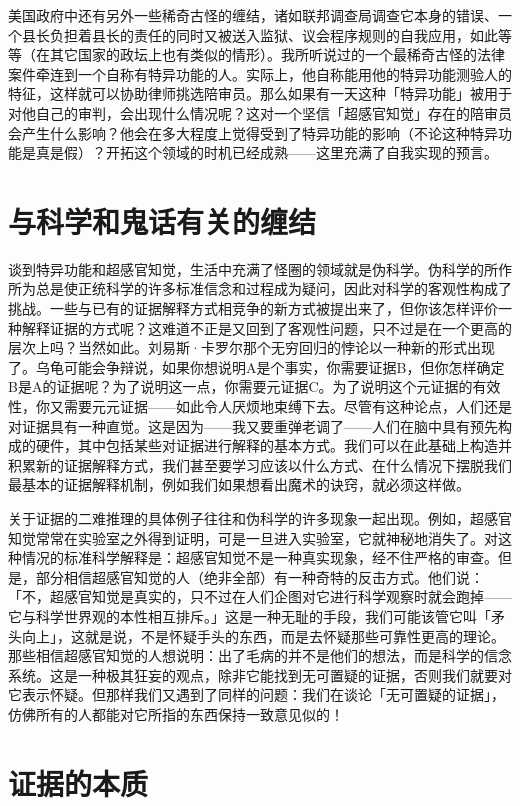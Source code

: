\documentclass[
  12pt,
  twoside,
  openright,
  oldfontcommands,
]{memoir}
\begin{document}
美国政府中还有另外一些稀奇古怪的缠结，诸如联邦调查局调查它本身的错误、一个县长负担着县长的责任的同时又被送入监狱、议会程序规则的自我应用，如此等等（在其它国家的政坛上也有类似的情形）。我所听说过的一个最稀奇古怪的法律案件牵连到一个自称有特异功能的人。实际上，他自称能用他的特异功能测验人的特征，这样就可以协助律师挑选陪审员。那么如果有一天这种「特异功能」被用于对他自己的审判，会出现什么情况呢？这对一个坚信「超感官知觉」存在的陪审员会产生什么影响？他会在多大程度上觉得受到了特异功能的影响（不论这种特异功能是真是假）？开拓这个领域的时机已经成熟------这里充满了自我实现的预言。

\section{与科学和鬼话有关的缠结}

谈到特异功能和超感官知觉，生活中充满了怪圈的领域就是伪科学。伪科学的所作所为总是使正统科学的许多标准信念和过程成为疑问，因此对科学的客观性构成了挑战。一些与已有的证据解释方式相竞争的新方式被提出来了，但你该怎样评价一种解释证据的方式呢？这难道不正是又回到了客观性问题，只不过是在一个更高的层次上吗？当然如此。刘易斯·卡罗尔那个无穷回归的悖论以一种新的形式出现了。乌龟可能会争辩说，如果你想说明A是个事实，你需要证据B，但你怎样确定B是A的证据呢？为了说明这一点，你需要元证据C。为了说明这个元证据的有效性，你又需要元元证据------如此令人厌烦地束缚下去。尽管有这种论点，人们还是对证据具有一种直觉。这是因为------我又要重弹老调了------人们在脑中具有预先构成的硬件，其中包括某些对证据进行解释的基本方式。我们可以在此基础上构造并积累新的证据解释方式，我们甚至要学习应该以什么方式、在什么情况下摆脱我们最基本的证据解释机制，例如我们如果想看出魔术的诀窍，就必须这样做。

关于证据的二难推理的具体例子往往和伪科学的许多现象一起出现。例如，超感官知觉常常在实验室之外得到证明，可是一旦进入实验室，它就神秘地消失了。对这种情况的标准科学解释是：超感官知觉不是一种真实现象，经不住严格的审查。但是，部分相信超感官知觉的人（绝非全部）有一种奇特的反击方式。他们说：「不，超感官知觉是真实的，只不过在人们企图对它进行科学观察时就会跑掉------它与科学世界观的本性相互排斥。」这是一种无耻的手段，我们可能该管它叫「矛头向上」，这就是说，不是怀疑手头的东西，而是去怀疑那些可靠性更高的理论。那些相信超感官知觉的人想说明：出了毛病的并不是他们的想法，而是科学的信念系统。这是一种极其狂妄的观点，除非它能找到无可置疑的证据，否则我们就要对它表示怀疑。但那样我们又遇到了同样的问题：我们在谈论「无可置疑的证据」，仿佛所有的人都能对它所指的东西保持一致意见似的！

\section{证据的本质}
\end{document}
